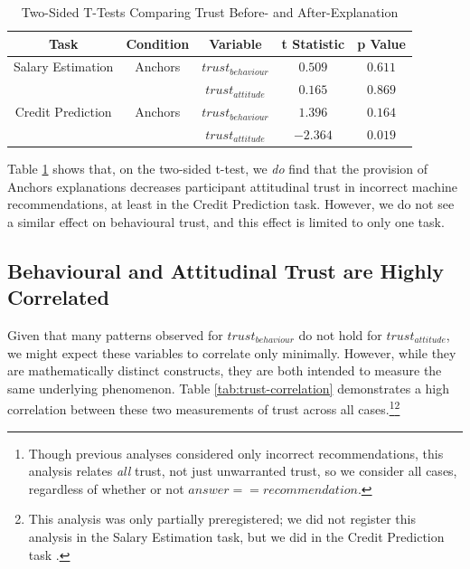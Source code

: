 \begin{table}[htbp]
    \caption{Two-Sided T-Tests Comparing Trust Before- and After-Explanation}
    \begin{center}
    \begin{tabular}{ccccc}
        \toprule
        Task & Condition & Variable & t Statistic & p Value \\ 
        \midrule
        Salary Estimation & Anchors & $trust_{behaviour}$ & $0.509$ & $0.611$ \\
        & & $trust_{attitude}$ & $0.165$ & $0.869$ \\
        \midrule
        Credit Prediction & Anchors & $trust_{behaviour}$ & $1.396$ & $0.164$ \\
        & & $trust_{attitude}$ & $\mathbf{-2.364}$ & $\mathbf{0.019}$ \\
        \bottomrule
    \end{tabular}
    \label{tab:delta-trust-t-2}
    \end{center}
\end{table}

Table \ref{tab:delta-trust-t-2} shows that, on the two-sided t-test, we \textit{do} find that the provision of Anchors explanations decreases participant attitudinal trust in incorrect machine recommendations, at least in the Credit Prediction task. However, we do not see a similar effect on behavioural trust, and this effect is limited to only one task. 

\subsection{Behavioural and Attitudinal Trust are Highly Correlated}\label{ssec:trust-corr}
Given that many patterns observed for $trust_{behaviour}$ do not hold for $trust_{attitude}$, we might expect these variables to correlate only minimally. However, while they are mathematically distinct constructs, they are both intended to measure the same underlying phenomenon. Table \ref{tab:trust-correlation} demonstrates a high correlation between these two measurements of trust across all cases.\footnote{Though previous analyses considered only incorrect recommendations, this analysis relates \textit{all} trust, not just unwarranted trust, so we consider all cases, regardless of whether or not $answer == recommendation$.}\footnote{This analysis was only partially preregistered; we did not register this analysis in the Salary Estimation task, but we did in the Credit Prediction task \cite{natarajan_binns_2022}.}

